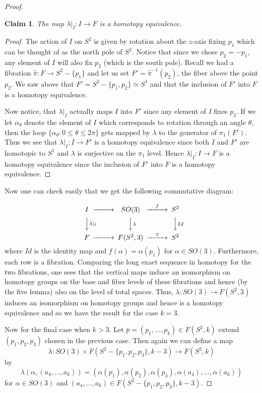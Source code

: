 \documentclass{amsart}
\newtheorem{claim}[thm]{Claim}
\begin{document}
\begin{proof}
\begin{claim}
The map $\lambda|_I : I \rightarrow F$ is a homotopy equivalence.
\end{claim}
\begin{proof}
The action of $I$ on $S^2$ is given
by rotation about the $z$-axis fixing $p_1$ which can be thought of as
the north pole of $S^2$. Notice that since we chose
$p_2=-p_1$, any element of $I$ will also fix $p_2$ (which is the south pole).
Recall we had a fibration $\hat{\pi}: F \rightarrow S^2 - \{p_1\}$ and let
us set $F' = \hat{\pi}^{-1}(p_2)$, the fiber above the point $p_2$. We saw
above that $F' = S^2 - \{p_1,p_2\} \simeq S^1$ 
and that the 
inclusion
of $F'$ into $F$ is a homotopy equivalence. 

Now notice, that $\lambda|_I$ actually maps $I$ into $F'$ since any element
of $I$ fixes $p_2$. If we let $\alpha_{\theta}$ denote the element of
$I$ which corresponds to rotation through an angle $\theta$, then the
loop $\{ \alpha_{\theta} : 0 \leq \theta \leq 2\pi \}$ gets mapped
by $\lambda$ to the generator of $\pi_1(F')$. Thus we see
that $\lambda |_{I} : I \rightarrow F'$ is a homotopy equivalence since
both $I$ and $F'$ are homotopic to $S^1$ and $\lambda$ is surjective
on the $\pi_1$ level. 
Hence $\lambda |_{I} : I \rightarrow F$ is a homotopy equivalence
since the inclusion of $F'$ into $F$ is a homotopy equivalence.  
\end{proof}

Now one can check easily that we get the following commutative diagram:

$$
\begin{CD}
I @>>> SO(3) @> f >> S^2 \\
@VV \lambda |_I V @VV \lambda V @VV Id V \\
F @>>> F(S^2,3) @> \pi >> S^2
\end{CD}
$$
where $Id$ is the identity map and $f(\alpha) = \alpha(p_1)$ for $\alpha \in
SO(3)$. Furthermore, each row is a fibration. Comparing  
the long exact sequence in homotopy for the two fibrations, one sees
that the vertical maps induce an isomorphism on homotopy groups
on the base and fiber levels of these fibrations and hence (by the five lemma)
 also on the level
of total spaces. Thus, 
$\lambda: SO(3) \rightarrow F(S^2,3)$
induces an isomorphism on homotopy groups and hence is a homotopy
equivalence and so we have the result for the case $k=3$.
 
	Now for the final case when $k > 3$. Let $\bar{p}=(p_1,\dots,p_k)
\in F(S^2,k)$ extend $(p_1,p_2,p_3)$ chosen in the previous case.
Then again we can define a map 
$$
\lambda: SO(3) \times F(S^2 - \{p_1,p_2,p_3\},k-3) \rightarrow F(S^2,k)
$$
by 
$$
\lambda(\alpha, (a_4,\dots, a_k)) = (\alpha(p_1),\alpha(p_2),\alpha(p_3),
\alpha(a_4),\dots,\alpha(a_k))
$$
for $\alpha \in SO(3)$ and $(a_4,\dots,a_k) \in F(S^2-\{p_1,p_2,p_3\},k-3)$.


\end{proof}
\end{document}
